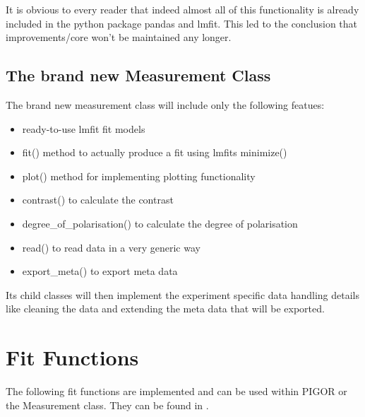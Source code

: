 \documentclass[letterpaper,10pt,english]{sphinxmanual}
\begin{document}
It is obvious to every reader that indeed almost all of this functionality is already included in the python package pandas and lmfit. This led to the conclusion that improvements/core won’t be maintained any longer.


\section{The brand new Measurement Class}
\label{\detokenize{measurement2:the-brand-new-measurement-class}}
The brand new measurement class will include only the following featues:
\begin{itemize}
\item {} 
ready-to-use lmfit fit models

\item {} 
fit() method to actually produce a fit using lmfits minimize()

\item {} 
plot() method for implementing plotting functionality

\item {} 
contrast() to calculate the contrast

\item {} 
degree\_of\_polarisation() to calculate the degree of polarisation

\item {} 
read() to read data in a very generic way

\item {} 
export\_meta() to export meta data

\end{itemize}

Its child classes will then implement the experiment specific data handling details like cleaning the data and extending the meta data that will be exported.


\chapter{Fit Functions}
\label{\detokenize{fit-functions:fit-functions}}\label{\detokenize{fit-functions::doc}}
The following fit functions are implemented and can be used within PIGOR or the Measurement class. They can be found in .

\label{\detokenize{fit-functions:module-fit_functions}}
\end{document}
